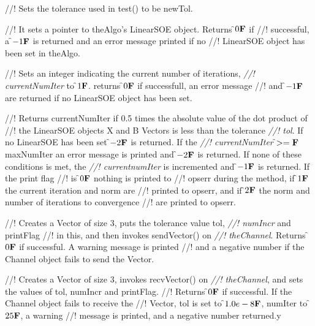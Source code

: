 //! Sets the tolerance used in test() to be \p newTol.

//! It sets a pointer to \p theAlgo's LinearSOE object. Returns \f$0{\bf F}$ if
//! successful, a \f$-1{\bf F}$ is returned and an error message printed if no
//! LinearSOE object has been set in \p theAlgo.


//! Sets an integer indicating the current number of iterations, {\em
//! currentNumIter} to \f$1{\bf F}$. returns \f$0{\bf F}$ if successfull, an error message
//! and \f$-1{\bf F}$ are returned if no LinearSOE object has been set.

//! Returns {currentNumIter} if 0.5 times the absolute value of the dot product of
//! the LinearSOE objects X and B Vectors is less than the tolerance {\em
//! tol}. If no LinearSOE has been set \f$-2{\bf F}$ is returned. If the {\em
//! currentNumIter} \f$>={\bf F}$ \p maxNumIter an error message is printed and
\f$-2{\bf F}$ is returned. If none of these conditions is met, the {\em
//! currentnumIter} is incremented and \f$-1{\bf F}$ is returned. If the print flag
//! is \f$0{\bf F}$ nothing is printed to 
//! opserr during the method, if \f$1{\bf F}$ the current iteration and norm are
//! printed to opserr, and if \f$2{\bf F}$ the norm and number of iterations to convergence
//! are printed to opserr. 


//! Creates a Vector of size 3, puts the tolerance value \p tol, {\em
//! numIncr} and \p printFlag
//! in this, and then invokes sendVector() on {\em
//! theChannel}. Returns \f$0{\bf F}$ if successful. A warning message is printed
//! and a negative number if the Channel object fails to send the Vector. 

//! Creates a Vector of size 3, invokes recvVector() on {\em
//! theChannel}, and sets the values of \p tol, \p numIncr and \p printFlag.
//! Returns \f$0{\bf F}$ if successful. If the Channel object fails to receive the
//! Vector, \p tol is set to \f$1.0e-8{\bf F}$, \p numIter to \f$25{\bf F}$, a warning
//! message is printed, and a negative number returned.y




